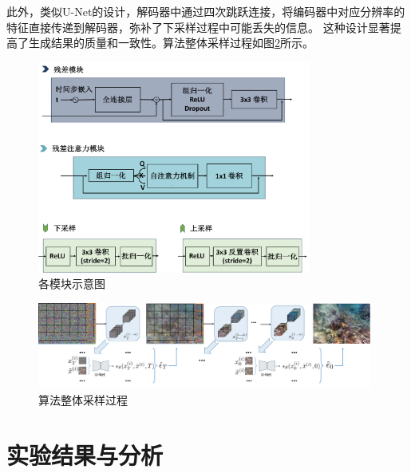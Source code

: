 此外，类似U-Net的设计，解码器中通过四次跳跃连接，将编码器中对应分辨率的特征直接传递到解码器，弥补了下采样过程中可能丢失的信息。
这种设计显著提高了生成结果的质量和一致性。算法整体采样过程如图\ref{img:sample_process}所示。
\begin{figure}[ht]
    \centering
    \includegraphics[width=0.8\textwidth]{figures/ch3/module.pdf}
    \caption{各模块示意图}
    \label{img:module}
    \vspace{0.4cm}
\end{figure}

\begin{figure}[ht]
    \centering
    \includegraphics[width=0.98\textwidth]{figures/ch3/sample_process.pdf}
    \caption{算法整体采样过程}
    \label{img:sample_process}
\end{figure} 

\section{实验结果与分析}
